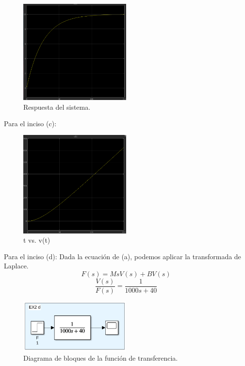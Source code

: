 \documentclass[12pt, letterpaper]{article}
\begin{document}
\begin{enumerate}
		\begin{figure}[H]
			\centering
			\includegraphics[width=0.5\textwidth]{5.png}
			\caption{Respuesta del sistema.}
		\end{figure}
		Para el inciso (c):
		\begin{figure}[H]
			\centering
			\includegraphics[width=0.5\textwidth]{6.png}
			\caption{t vs. v(t)}
		\end{figure}
		Para el inciso (d):
		Dada la ecuación de (a), podemos aplicar la transformada de Laplace.
		\begin{equation}
			F(s) = MsV(s) + BV(s)
		\end{equation}
		\begin{equation}
			\boxed{\frac{V(s)}{F(s)} = \frac{1}{1000s + 40}}
		\end{equation}

		\begin{figure}[H]
			\centering
			\includegraphics[width=0.5\textwidth]{7.png}
			\caption{Diagrama de bloques de la función de transferencia.}
		\end{figure}


\end{enumerate}
\end{document}
